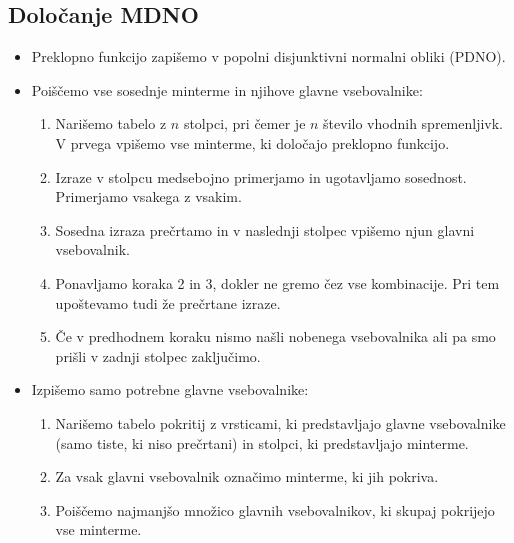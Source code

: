 \subsection{Določanje MDNO}
\begin{itemize}
\item Preklopno funkcijo zapišemo v popolni disjunktivni normalni obliki (PDNO).
\item Poiščemo vse sosednje minterme in njihove glavne vsebovalnike:
\begin{enumerate}
\item Narišemo tabelo z $n$ stolpci, pri čemer je $n$ število vhodnih spremenljivk. V prvega vpišemo vse minterme, ki določajo preklopno funkcijo.
\item Izraze v stolpcu medsebojno primerjamo in ugotavljamo sosednost. Primerjamo vsakega z vsakim.
\item Sosedna izraza prečrtamo in v naslednji stolpec vpišemo njun glavni vsebovalnik.
\item Ponavljamo koraka 2 in 3, dokler ne gremo čez vse kombinacije. Pri tem upoštevamo tudi že prečrtane izraze.
\item Če v predhodnem koraku nismo našli nobenega vsebovalnika ali pa smo prišli v zadnji stolpec zaključimo.
\end{enumerate}
\item Izpišemo samo potrebne glavne vsebovalnike:
\begin{enumerate}
\item Narišemo tabelo pokritij z vrsticami, ki predstavljajo glavne vsebovalnike (samo tiste, ki niso prečrtani) in stolpci, ki predstavljajo minterme.
\item Za vsak glavni vsebovalnik označimo minterme, ki jih pokriva.
\item Poiščemo najmanjšo množico glavnih vsebovalnikov, ki skupaj pokrijejo vse minterme.
\end{enumerate}
\end{itemize}

